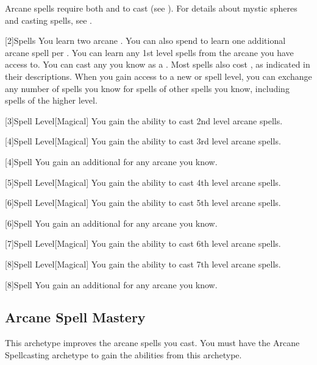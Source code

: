        Arcane spells require both  and  to cast (see ).
        For details about mystic spheres and casting spells, see .

        [2]{Spells} You learn two arcane .
        You can also spend  to learn one additional arcane spell per .
        You can learn any 1st level spells from the arcane  you have access to.
        You can cast any  you know as a .
        Most spells also cost , as indicated in their descriptions.
        When you gain access to a new  or spell level, you can exchange any number of spells you know for spells of other spells you know, including spells of the higher level.

        [3]{Spell Level}[Magical] You gain the ability to cast 2nd level arcane spells.

        [4]{Spell Level}[Magical] You gain the ability to cast 3rd level arcane spells.

        [4]{Spell} You gain an additional  for any arcane  you know.

        [5]{Spell Level}[Magical] You gain the ability to cast 4th level arcane spells.

        [6]{Spell Level}[Magical] You gain the ability to cast 5th level arcane spells.

        [6]{Spell} You gain an additional  for any arcane  you know.

        [7]{Spell Level}[Magical] You gain the ability to cast 6th level arcane spells.

        [8]{Spell Level}[Magical] You gain the ability to cast 7th level arcane spells.

        [8]{Spell} You gain an additional  for any arcane  you know.

    \subsection{Arcane Spell Mastery}
        This archetype improves the arcane spells you cast.
        You must have the Arcane Spellcasting archetype to gain the abilities from this archetype.

